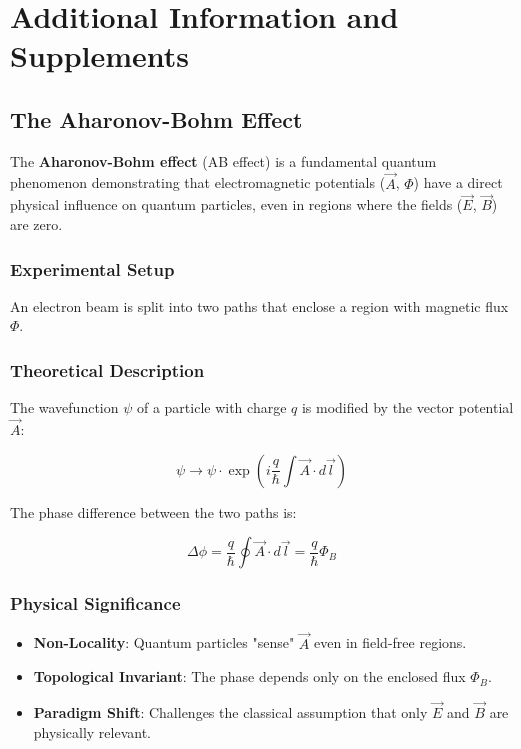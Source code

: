 \chapter{Additional Information and Supplements}
\section{The Aharonov-Bohm Effect}
\label{sec:aharonov-bohm}

The \textbf{Aharonov-Bohm effect} (AB effect) is a fundamental quantum phenomenon demonstrating that electromagnetic potentials ($\vec{A}$, $\Phi$) have a direct physical influence on quantum particles, even in regions where the fields ($\vec{E}$, $\vec{B}$) are zero.

\subsection{Experimental Setup}
An electron beam is split into two paths that enclose a region with magnetic flux $\Phi$.

\subsection{Theoretical Description}
The wavefunction $\psi$ of a particle with charge $q$ is modified by the vector potential $\vec{A}$:

\begin{equation}
\psi \rightarrow \psi \cdot \exp\left(i\frac{q}{\hbar}\int \vec{A}\cdot d\vec{l}\right)
\end{equation}

The phase difference between the two paths is:

\begin{equation}
\Delta\phi = \frac{q}{\hbar}\oint \vec{A}\cdot d\vec{l} = \frac{q}{\hbar}\Phi_B
\end{equation}

\subsection{Physical Significance}
\begin{itemize}
\item \textbf{Non-Locality}: Quantum particles "sense" $\vec{A}$ even in field-free regions.
\item \textbf{Topological Invariant}: The phase depends only on the enclosed flux $\Phi_B$.
\item \textbf{Paradigm Shift}: Challenges the classical assumption that only $\vec{E}$ and $\vec{B}$ are physically relevant.
\end{itemize}

